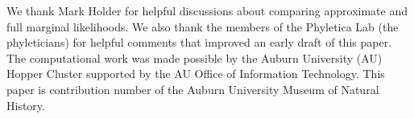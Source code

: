 We thank Mark Holder for helpful discussions about comparing approximate and
full marginal likelihoods.
We also thank the members of the Phyletica Lab (the phyleticians) for helpful
comments that improved an early draft of this paper.
The computational work was made possible by the Auburn University (AU) Hopper
Cluster supported by the AU Office of Information Technology.
This paper is contribution number  of the Auburn University
Museum of Natural History.
